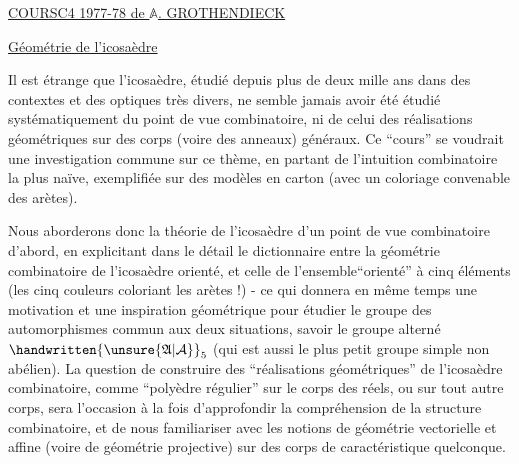 \begin{center}
\setlength{\ULdepth}{1.45\baselineskip}
\uline{COURS\quad C4 1977-78 de $\mathbb A$. GROTHENDIECK}\par\vspace{.6\baselineskip}
\end{center}

\uline{Géométrie de l'icosaèdre}

Il est étrange que l'icosaèdre, étudié depuis plus de deux mille ans dans des contextes et des optiques très divers, ne semble jamais avoir été étudié systématiquement du point de vue combinatoire, ni de celui des réalisations géométriques sur des corps (voire des anneaux) généraux. Ce ``cours'' se voudrait une investigation commune sur ce thème, en partant de l'intuition combinatoire la plus naïve, exemplifiée sur des modèles en carton (avec un coloriage convenable des arètes).

Nous aborderons donc la théorie de l'icosaèdre d'un point de vue combinatoire d'abord, en explicitant dans le détail le dictionnaire entre la géométrie combinatoire de l'icosaèdre orienté, et celle de l'ensemble``orienté'' à cinq éléments (les cinq couleurs coloriant les arètes !) - ce qui donnera en même temps une motivation et une inspiration géométrique pour étudier le groupe des automorphismes commun aux deux situations, savoir le groupe alterné%
%
 $\handwritten{\unsure{\mathfrak A|\mathcal A}}_5$ (qui est aussi le plus petit groupe simple non abélien). La question de construire des ``réalisations géométriques'' de l'icosaèdre combinatoire, comme ``polyèdre régulier'' sur le corps des réels, ou sur tout autre corps, sera l'occasion à la fois d'approfondir la compréhension de la structure combinatoire, et de nous familiariser avec les notions de géométrie vectorielle et affine (voire de géométrie projective) sur des corps de caractéristique quelconque.

